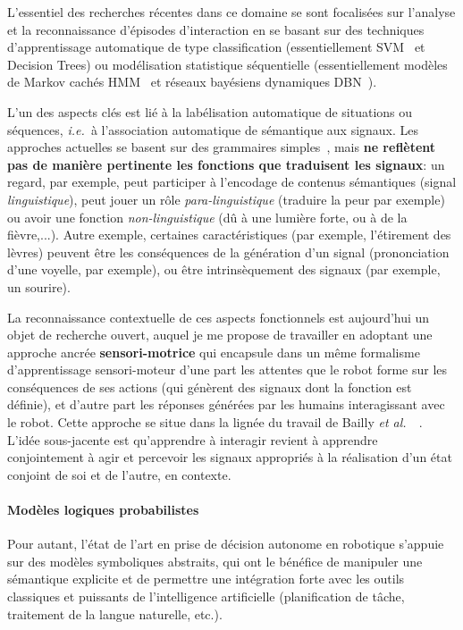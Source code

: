 \documentclass[a4paper]{article}
\newcommand{\etal}{{\textit{et al.~}}}
\newcommand{\ie}{{\textit{i.e.~}}}
\begin{document}
L'essentiel des recherches récentes dans ce domaine se sont focalisées sur
l'analyse et la reconnaissance d'épisodes d'interaction en se basant sur des
techniques d'apprentissage automatique de type classification (essentiellement
SVM~\cite{jayagopi2009modeling} et Decision Trees) ou modélisation statistique
séquentielle (essentiellement modèles de Markov cachés
HMM~\cite{zhang2006modeling,mihoub2014modeling} et réseaux bayésiens dynamiques
DBN~\cite{otsuka2007automatic}).

L'un des aspects clés est lié à la labélisation automatique de situations ou
séquences, \ie à l'association automatique de sémantique aux signaux. Les
approches actuelles se basent sur des grammaires
simples~\cite{mihoub2014modeling}, mais \textbf{ne reflètent pas de manière
pertinente les fonctions que traduisent les signaux}: un regard, par exemple,
peut participer à l'encodage de contenus sémantiques (signal
\emph{linguistique}), peut jouer un rôle \emph{para-linguistique} (traduire la
peur par exemple) ou avoir une fonction \emph{non-linguistique} (dû à une
lumière forte, ou à de la fièvre,...). Autre exemple, certaines caractéristiques
(par exemple, l'étirement des lèvres) peuvent être les conséquences de la
génération d'un signal (prononciation d'une voyelle, par exemple), ou être
intrinsèquement des signaux (par exemple, un sourire).

La reconnaissance contextuelle de ces aspects fonctionnels est aujourd'hui un
objet de recherche ouvert, auquel je me propose de travailler en adoptant une
approche ancrée \textbf{sensori-motrice} qui encapsule dans un même formalisme
d'apprentissage sensori-moteur d'une part les attentes que le robot forme sur
les conséquences de ses actions (qui génèrent des signaux dont la fonction est
définie), et d'autre part les réponses générées par les humains interagissant
avec le robot. Cette approche se situe dans la lignée du travail de Bailly
\etal~\cite{mihoub2014modeling}. L'idée sous-jacente est qu'apprendre à
interagir revient à apprendre conjointement à agir et percevoir les signaux
appropriés à la réalisation d'un état conjoint de soi et de l'autre, en
contexte.

\paragraph{Modèles logiques probabilistes}

Pour autant, l'état de l'art en prise de décision autonome en robotique s'appuie
sur des modèles symboliques abstraits, qui ont le bénéfice de manipuler une
sémantique explicite et de permettre une intégration forte avec les outils
classiques et puissants de l'intelligence artificielle (planification de tâche,
traitement de la langue naturelle, etc.).
\end{document}
